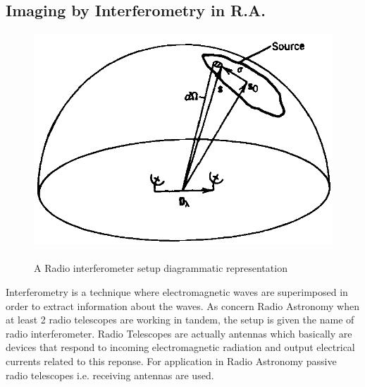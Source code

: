 \subsection{Imaging by Interferometry in R.A.}
\label{sec:intIntro}
\begin{figure}[htbp]

  \begin{center}
    \includegraphics[scale= 1.3]{Figures/sSource}
  \end{center}
  
 	\caption[Diagrammatic representation of an elementary radio interferometer setup]{\\ A Radio interferometer setup diagrammatic representation}
	\label{fig:RadioIntSphere}
	
\end{figure}
Interferometry is a technique where electromagnetic waves are superimposed in order to extract information about the waves. As concern Radio Astronomy when at least 2 radio telescopes are working in tandem, the setup is given the name of radio interferometer. Radio Telescopes are actually antennas which basically are devices that respond to incoming electromagnetic radiation and output electrical currents related to this reponse.
For application in Radio Astronomy passive radio telescopes i.e. receiving antennas are used.

